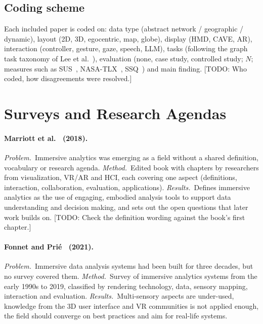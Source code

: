 \documentclass[11pt,a4paper]{article}
\newif\ifshowtodos \showtodostrue
\newcommand{\todo}[2][]{\ifshowtodos{\color{red}\footnotesize[TODO: #2]}\fi}
\begin{document}
\subsection{Coding scheme}
Each included paper is coded on: data type (abstract network / geographic / dynamic),
layout (2D, 3D, egocentric, map, globe), display (HMD, CAVE, AR), interaction (controller,
gesture, gaze, speech, LLM), tasks (following the graph task
taxonomy of Lee et al.~\cite{lee2006task}), evaluation (none, case study, controlled study;
$N$; measures such as SUS~\cite{brooke1996sus}, NASA-TLX~\cite{hart1988nasatlx},
SSQ~\cite{kennedy1993ssq}) and main finding.
\todo{Who coded, how disagreements were resolved.}

\newcommand{\src}[1]{\paragraph{#1}}
\newcommand{\prob}{\textit{Problem.}~}
\newcommand{\meth}{\textit{Method.}~}
\newcommand{\res}{\textit{Results.}~}

\section{Surveys and Research Agendas}
\label{sec:surveys}

\src{Marriott et al.~\cite{marriott2018immersive} (2018).}
\prob Immersive analytics was emerging as a field without a shared definition, vocabulary
or research agenda.
\meth Edited book with chapters by researchers from visualization, VR/AR and HCI, each
covering one aspect (definitions, interaction, collaboration, evaluation, applications).
\res Defines immersive analytics as the use of engaging, embodied analysis tools to
support data understanding and decision making, and sets out the open questions that later
work builds on.
\todo{Check the definition wording against the book's first chapter.}

\src{Fonnet and Pri\'e~\cite{fonnet2021survey} (2021).}
\prob Immersive data analysis systems had been built for three decades, but no survey
covered them.
\meth Survey of immersive analytics systems from the early 1990s to 2019, classified by
rendering technology, data, sensory mapping, interaction and evaluation.
\res Multi-sensory aspects are under-used, knowledge from the 3D user interface and VR
communities is not applied enough, the field should converge on best practices and aim for
real-life systems.
\end{document}
